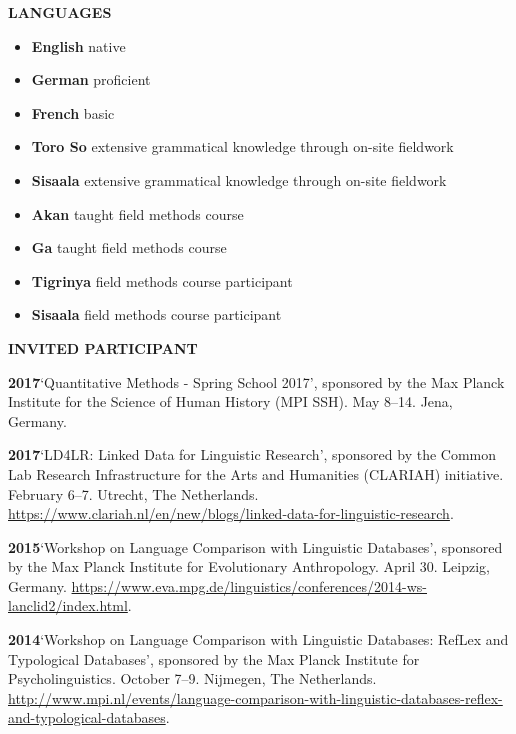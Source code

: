 \documentclass[11pt]{article}
\newcommand{\hangpara}{
 \setlength{\parindent}{0in} %
 \hangindent=0.42in %
}
\begin{document}
\vskip 10pt
\begin{flushleft}
{\bf LANGUAGES}
\end{flushleft}
\begin{itemize}
\item {\bf English} native
\item {\bf German} proficient
\item {\bf French} basic
\item {\bf Toro So} extensive grammatical knowledge through on-site fieldwork
\item {\bf Sisaala} extensive grammatical knowledge through on-site fieldwork
\item {\bf Akan} taught field methods course
\item {\bf Ga} taught field methods course
\item {\bf Tigrinya} field methods course participant
\item {\bf Sisaala} field methods course participant
\end{itemize}


\vskip 10pt
\begin{flushleft}
{\bf INVITED PARTICIPANT}
\end{flushleft}

\hangpara
{\bf 2017}\hspace{1ex}`Quantitative Methods - Spring School 2017', sponsored by the Max Planck Institute for the Science of Human History (MPI SSH). May 8--14. Jena, Germany.

\hangpara
\vskip 6pt
{\bf 2017}\hspace{1ex}`LD4LR: Linked Data for Linguistic Research', sponsored by the Common Lab Research Infrastructure for the Arts and Humanities (CLARIAH) initiative. February 6--7. Utrecht, The Netherlands. \url{https://www.clariah.nl/en/new/blogs/linked-data-for-linguistic-research}.

\hangpara
\vskip 6pt
{\bf 2015}\hspace{1ex}`Workshop on Language Comparison with Linguistic Databases', sponsored by the Max Planck Institute for Evolutionary Anthropology. April 30. Leipzig, Germany. \url{https://www.eva.mpg.de/linguistics/conferences/2014-ws-lanclid2/index.html}.

\hangpara
\vskip 6pt
{\bf 2014}\hspace{1ex}`Workshop on Language Comparison with Linguistic Databases: RefLex and Typological Databases', sponsored by the Max Planck Institute for Psycholinguistics. October 7--9. Nijmegen, The Netherlands. \url{http://www.mpi.nl/events/language-comparison-with-linguistic-databases-reflex-and-typological-databases}.
\end{document}
